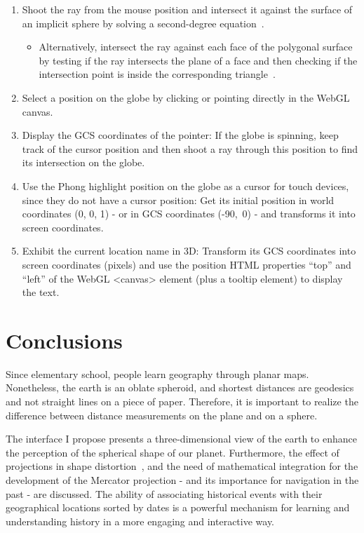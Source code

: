 \documentclass[conference]{IEEEtran}
\begin{document}
\begin{enumerate}
    \item Shoot the ray from the mouse position and intersect it against the surface of an
          implicit sphere by solving a second-degree equation~\cite{IllusionCatalyst}.
    \begin{itemize}
        \item Alternatively, intersect the ray against each face of the polygonal surface by
              testing if the ray intersects the plane of a face and then checking if the intersection point is inside the corresponding
              triangle~\cite{Carvalho1995Point}.
    \end{itemize}
    \item Select a position on the globe by clicking or pointing directly in the WebGL canvas.
    \item Display the GCS coordinates of the pointer: If the globe is spinning, keep track of the cursor position and
    then shoot a ray through this position to find its intersection on the globe.
    \item Use the Phong highlight position on the globe as a cursor for touch devices,
          since they do not have a cursor position: Get its initial position in world coordinates
          (0, 0, 1) - or in GCS coordinates \mbox{(-90\textdegree, 0\textdegree)} - and transforms it into screen coordinates.
    \item Exhibit the current location name in 3D: Transform its GCS coordinates into screen coordinates
    (pixels) and use the position HTML properties ``top'' and ``left'' of the WebGL <canvas> element (plus a tooltip element) to display the text.
\end{enumerate}

\section{Conclusions}
Since elementary school, people learn geography through planar maps.
Nonetheless, the earth is an oblate spheroid, and shortest distances are geodesics~\cite{Busemann1955}
and not straight lines on a piece of paper.
Therefore, it is important to realize the difference between distance measurements on the plane and on a sphere.

The interface I propose presents a three-dimensional view of the earth to enhance the perception of the spherical shape of our planet.
Furthermore, the effect of projections in shape distortion~\cite{TrueSize}, and the need of mathematical integration
for the development of the Mercator projection - and its importance for navigation in the past - are discussed.
The ability of associating historical events with their geographical locations sorted by dates is a
powerful mechanism for learning and understanding history in a more engaging and interactive way.
\end{document}
